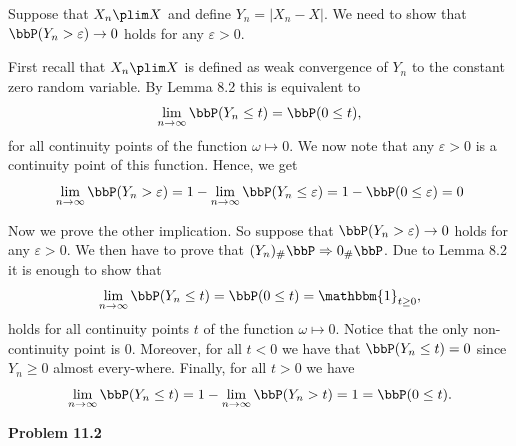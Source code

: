 \documentclass{lecturenotes}
\begin{document}
Suppose that $X_n \plim X$ and define $Y_n = |X_n - X|$. We need to show that $\bbP(Y_n > \varepsilon) \to 0$ holds for any $\varepsilon > 0$. 

First recall that $X_n \plim X$ is defined as weak convergence of $Y_n$ to the constant zero random variable. By Lemma 8.2 this is equivalent to 
\[
	\lim_{n \to \infty} \bbP(Y_n \le t) = \bbP(0 \le t),
\]
for all continuity points of the function $\omega \mapsto 0$. We now note that any $\varepsilon > 0$ is a continuity point of this function. Hence, we get
\[
	\lim_{n \to \infty} \bbP(Y_n > \varepsilon) = 1 - \lim_{n \to \infty} \bbP(Y_n \le \varepsilon) = 1 - \bbP(0 \le \varepsilon) = 0
\]

Now we prove the other implication. So suppose that $\bbP(Y_n > \varepsilon) \to 0$ holds for any $\varepsilon > 0$. We then have to prove that $(Y_n)_\# \bbP \Rightarrow 0_\# \bbP$. Due to Lemma 8.2 it is enough to show that
\[
	\lim_{n \to \infty} \bbP(Y_n \le t) = \bbP(0 \le t) = \mathbbm{1}_{t \ge 0},
\]
holds for all continuity points $t$ of the function $\omega \mapsto 0$. Notice that the only non-continuity point is $0$. Moreover, for all $t < 0$ we have that $\bbP(Y_n \le t) = 0$ since $Y_n \ge 0$ almost every-where. Finally, for all $t > 0$ we have
\[
	\lim_{n \to \infty} \bbP(Y_n \le t) = 1 - \lim_{n \to \infty} \bbP(Y_n > t) = 1 = \bbP(0 \le t). 
\]

\textbf{Problem 11.2}
\end{document}
